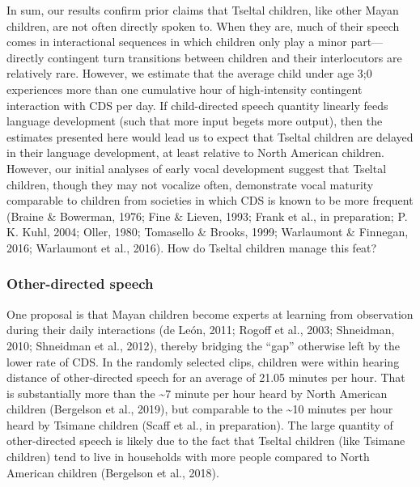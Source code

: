 \documentclass[floatsintext,man]{apa6}
\theoremstyle{definition}
\theoremstyle{definition}
\theoremstyle{definition}
\theoremstyle{remark}
\begin{document}
In sum, our results confirm prior claims that Tseltal children, like
other Mayan children, are not often directly spoken to. When they are,
much of their speech comes in interactional sequences in which children
only play a minor part---directly contingent turn transitions between
children and their interlocutors are relatively rare. However, we
estimate that the average child under age 3;0 experiences more than one
cumulative hour of high-intensity contingent interaction with CDS per
day. If child-directed speech quantity linearly feeds language
development (such that more input begets more output), then the
estimates presented here would lead us to expect that Tseltal children
are delayed in their language development, at least relative to North
American children. However, our initial analyses of early vocal
development suggest that Tseltal children, though they may not vocalize
often, demonstrate vocal maturity comparable to children from societies
in which CDS is known to be more frequent (Braine \& Bowerman, 1976;
Fine \& Lieven, 1993; Frank et al., in preparation; P. K. Kuhl, 2004;
Oller, 1980; Tomasello \& Brooks, 1999; Warlaumont \& Finnegan, 2016;
Warlaumont et al., 2016). How do Tseltal children manage this feat?

\subsubsection{Other-directed speech}\label{other-directed-speech}

One proposal is that Mayan children become experts at learning from
observation during their daily interactions (de León, 2011; Rogoff et
al., 2003; Shneidman, 2010; Shneidman et al., 2012), thereby bridging
the \enquote{gap} otherwise left by the lower rate of CDS. In the
randomly selected clips, children were within hearing distance of
other-directed speech for an average of 21.05 minutes per hour. That is
substantially more than the \textasciitilde{}7 minute per hour heard by
North American children (Bergelson et al., 2019), but comparable to the
\textasciitilde{}10 minutes per hour heard by Tsimane children (Scaff et
al., in preparation). The large quantity of other-directed speech is
likely due to the fact that Tseltal children (like Tsimane children)
tend to live in households with more people compared to North American
children (Bergelson et al., 2018).
\end{document}
